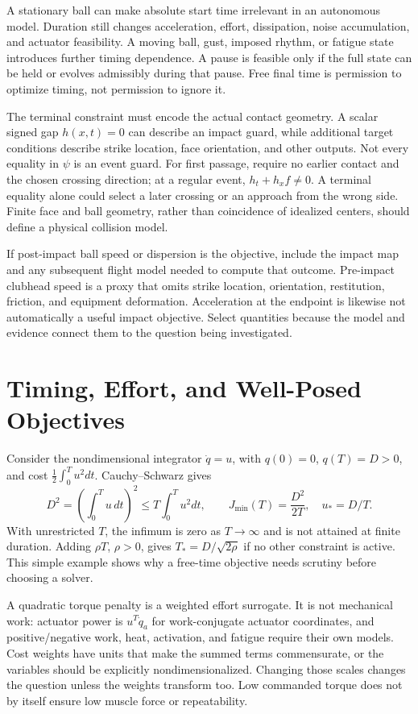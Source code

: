 A stationary ball can make absolute start time irrelevant in an autonomous
model. Duration still changes acceleration, effort, dissipation, noise
accumulation, and actuator feasibility. A moving ball, gust, imposed rhythm,
or fatigue state introduces further timing dependence. A pause is feasible
only if the full state can be held or evolves admissibly during that pause.
Free final time is permission to optimize timing, not permission to ignore it.

The terminal constraint must encode the actual contact geometry. A scalar
signed gap $h(x,t)=0$ can describe an impact guard, while additional target
conditions describe strike location, face orientation, and other outputs.
Not every equality in $\psi$ is an event guard. For first passage, require
no earlier contact and the chosen crossing direction; at a regular event,
$h_t+h_xf\ne0$. A terminal equality alone could select a later crossing or
an approach from the wrong side. Finite face and ball geometry, rather than
coincidence of idealized centers, should define a physical collision model.

If post-impact ball speed or dispersion is the objective, include the impact
map and any subsequent flight model needed to compute that outcome. Pre-impact
clubhead speed is a proxy that omits strike location, orientation, restitution,
friction, and equipment deformation. Acceleration at the endpoint is likewise
not automatically a useful impact objective. Select quantities because the
model and evidence connect them to the question being investigated.

\section{Timing, Effort, and Well-Posed Objectives}

Consider the nondimensional integrator $\dot q=u$, with $q(0)=0$, $q(T)=D>0$,
and cost $\tfrac12\int_0^T u^2dt$. Cauchy--Schwarz gives
\begin{equation}\label{eq:free_time_effort}
 D^2=\left(\int_0^T u\,dt\right)^2
 \leq T\int_0^T u^2dt,\qquad
 J_{\min}(T)=\frac{D^2}{2T},\quad u_*=D/T.
\end{equation}
With unrestricted $T$, the infimum is zero as $T\to\infty$ and is not attained
at finite duration. Adding $\rho T$, $\rho>0$, gives
$T_*=D/\sqrt{2\rho}$ if no other constraint is active. This simple example
shows why a free-time objective needs scrutiny before choosing a solver.

A quadratic torque penalty is a weighted effort surrogate. It is not
mechanical work: actuator power is $u^T\dot q_a$ for work-conjugate actuator
coordinates, and positive/negative work, heat, activation, and fatigue require
their own models. Cost weights have units that make the summed terms
commensurate, or the variables should be explicitly nondimensionalized.
Changing those scales changes the question unless the weights transform too.
Low commanded torque does not by itself ensure low muscle force or repeatability.

